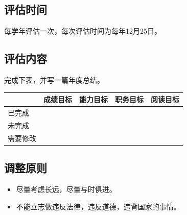 \documentclass{article}
\begin{document}
\subsection{评估时间}
每学年评估一次，每次评估时间为每年12月25日。\par
\subsection{评估内容}
完成下表，并写一篇年度总结。\par
\begin{table}[h]
	\centering
	\begin{tabular}{|l|l|l|l|l|}
		\hline
		& \textbf{成绩目标} & \textbf{能力目标} & \textbf{职务目标} & \textbf{阅读目标} \\ \hline
		已完成  &               &               &               &               \\ \hline
		未完成  &               &               &               &               \\ \hline
		需要修改 &               &               &               &               \\ \hline
	\end{tabular}
\end{table}
\subsection{调整原则}
\begin{itemize}
	\item 尽量考虑长远，尽量与时俱进。
	\item 不能立志做违反法律，违反道德，违背国家的事情。
\end{itemize}
\end{document}
